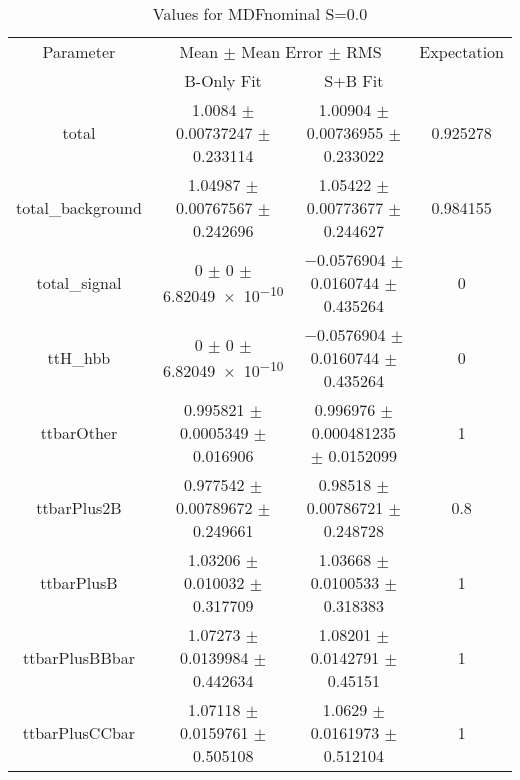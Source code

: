 \begin{table}
\centering
\caption{Values for MDFnominal S=0.0}
\begin{tabular}{cccc}
\toprule
Parameter & \multicolumn{2}{c}{Mean $\pm$ Mean Error $\pm$ RMS} & Expectation\\
 & B-Only Fit & S+B Fit & \\
\midrule
total & \num{1.0084} $\pm$ \num{0.00737247} $\pm$ \num{0.233114} & \num{1.00904} $\pm$ \num{0.00736955} $\pm$ \num{0.233022} & \num{0.925278}\\
total\_background & \num{1.04987} $\pm$ \num{0.00767567} $\pm$ \num{0.242696} & \num{1.05422} $\pm$ \num{0.00773677} $\pm$ \num{0.244627} & \num{0.984155}\\
total\_signal & \num{0} $\pm$ \num{0} $\pm$ \num{6.82049e-10} & \num{-0.0576904} $\pm$ \num{0.0160744} $\pm$ \num{0.435264} & \num{0}\\
ttH\_hbb & \num{0} $\pm$ \num{0} $\pm$ \num{6.82049e-10} & \num{-0.0576904} $\pm$ \num{0.0160744} $\pm$ \num{0.435264} & \num{0}\\
ttbarOther & \num{0.995821} $\pm$ \num{0.0005349} $\pm$ \num{0.016906} & \num{0.996976} $\pm$ \num{0.000481235} $\pm$ \num{0.0152099} & \num{1}\\
ttbarPlus2B & \num{0.977542} $\pm$ \num{0.00789672} $\pm$ \num{0.249661} & \num{0.98518} $\pm$ \num{0.00786721} $\pm$ \num{0.248728} & \num{0.8}\\
ttbarPlusB & \num{1.03206} $\pm$ \num{0.010032} $\pm$ \num{0.317709} & \num{1.03668} $\pm$ \num{0.0100533} $\pm$ \num{0.318383} & \num{1}\\
ttbarPlusBBbar & \num{1.07273} $\pm$ \num{0.0139984} $\pm$ \num{0.442634} & \num{1.08201} $\pm$ \num{0.0142791} $\pm$ \num{0.45151} & \num{1}\\
ttbarPlusCCbar & \num{1.07118} $\pm$ \num{0.0159761} $\pm$ \num{0.505108} & \num{1.0629} $\pm$ \num{0.0161973} $\pm$ \num{0.512104} & \num{1}\\
\bottomrule
\end{tabular}
\end{table}
